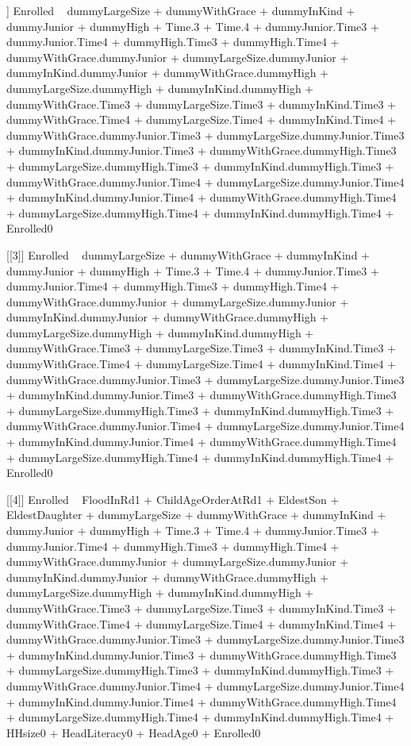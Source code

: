 \begin{Schunk}
\begin{Soutput}
[[2]]
Enrolled ~ dummyLargeSize + dummyWithGrace + dummyInKind + dummyJunior + 
    dummyHigh + Time.3 + Time.4 + dummyJunior.Time3 + dummyJunior.Time4 + 
    dummyHigh.Time3 + dummyHigh.Time4 + dummyWithGrace.dummyJunior + 
    dummyLargeSize.dummyJunior + dummyInKind.dummyJunior + dummyWithGrace.dummyHigh + 
    dummyLargeSize.dummyHigh + dummyInKind.dummyHigh + dummyWithGrace.Time3 + 
    dummyLargeSize.Time3 + dummyInKind.Time3 + dummyWithGrace.Time4 + 
    dummyLargeSize.Time4 + dummyInKind.Time4 + dummyWithGrace.dummyJunior.Time3 + 
    dummyLargeSize.dummyJunior.Time3 + dummyInKind.dummyJunior.Time3 + 
    dummyWithGrace.dummyHigh.Time3 + dummyLargeSize.dummyHigh.Time3 + 
    dummyInKind.dummyHigh.Time3 + dummyWithGrace.dummyJunior.Time4 + 
    dummyLargeSize.dummyJunior.Time4 + dummyInKind.dummyJunior.Time4 + 
    dummyWithGrace.dummyHigh.Time4 + dummyLargeSize.dummyHigh.Time4 + 
    dummyInKind.dummyHigh.Time4 + Enrolled0

[[3]]
Enrolled ~ dummyLargeSize + dummyWithGrace + dummyInKind + dummyJunior + 
    dummyHigh + Time.3 + Time.4 + dummyJunior.Time3 + dummyJunior.Time4 + 
    dummyHigh.Time3 + dummyHigh.Time4 + dummyWithGrace.dummyJunior + 
    dummyLargeSize.dummyJunior + dummyInKind.dummyJunior + dummyWithGrace.dummyHigh + 
    dummyLargeSize.dummyHigh + dummyInKind.dummyHigh + dummyWithGrace.Time3 + 
    dummyLargeSize.Time3 + dummyInKind.Time3 + dummyWithGrace.Time4 + 
    dummyLargeSize.Time4 + dummyInKind.Time4 + dummyWithGrace.dummyJunior.Time3 + 
    dummyLargeSize.dummyJunior.Time3 + dummyInKind.dummyJunior.Time3 + 
    dummyWithGrace.dummyHigh.Time3 + dummyLargeSize.dummyHigh.Time3 + 
    dummyInKind.dummyHigh.Time3 + dummyWithGrace.dummyJunior.Time4 + 
    dummyLargeSize.dummyJunior.Time4 + dummyInKind.dummyJunior.Time4 + 
    dummyWithGrace.dummyHigh.Time4 + dummyLargeSize.dummyHigh.Time4 + 
    dummyInKind.dummyHigh.Time4 + Enrolled0

[[4]]
Enrolled ~ FloodInRd1 + ChildAgeOrderAtRd1 + EldestSon + EldestDaughter + 
    dummyLargeSize + dummyWithGrace + dummyInKind + dummyJunior + 
    dummyHigh + Time.3 + Time.4 + dummyJunior.Time3 + dummyJunior.Time4 + 
    dummyHigh.Time3 + dummyHigh.Time4 + dummyWithGrace.dummyJunior + 
    dummyLargeSize.dummyJunior + dummyInKind.dummyJunior + dummyWithGrace.dummyHigh + 
    dummyLargeSize.dummyHigh + dummyInKind.dummyHigh + dummyWithGrace.Time3 + 
    dummyLargeSize.Time3 + dummyInKind.Time3 + dummyWithGrace.Time4 + 
    dummyLargeSize.Time4 + dummyInKind.Time4 + dummyWithGrace.dummyJunior.Time3 + 
    dummyLargeSize.dummyJunior.Time3 + dummyInKind.dummyJunior.Time3 + 
    dummyWithGrace.dummyHigh.Time3 + dummyLargeSize.dummyHigh.Time3 + 
    dummyInKind.dummyHigh.Time3 + dummyWithGrace.dummyJunior.Time4 + 
    dummyLargeSize.dummyJunior.Time4 + dummyInKind.dummyJunior.Time4 + 
    dummyWithGrace.dummyHigh.Time4 + dummyLargeSize.dummyHigh.Time4 + 
    dummyInKind.dummyHigh.Time4 + HHsize0 + HeadLiteracy0 + HeadAge0 + 
    Enrolled0


\end{Soutput}
\end{Schunk}
